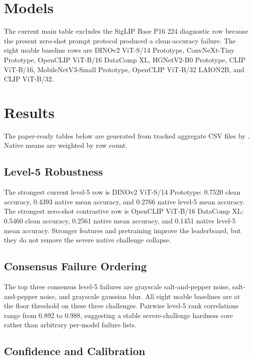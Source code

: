 \documentclass[10pt]{article}
\begin{document}
\section{Models}

The current main table excludes the SigLIP Base P16 224 diagnostic row because the present zero-shot prompt protocol produced a clean-accuracy failure. The eight usable baseline rows are DINOv2 ViT-S/14 Prototype, ConvNeXt-Tiny Prototype, OpenCLIP ViT-B/16 DataComp XL, HGNetV2-B0 Prototype, CLIP ViT-B/16, MobileNetV3-Small Prototype, OpenCLIP ViT-B/32 LAION2B, and CLIP ViT-B/32.

\section{Results}

The paper-ready tables below are generated from tracked aggregate CSV files by
. Native means are weighted by row count.

{\small

}

\subsection{Level-5 Robustness}

The strongest current level-5 row is DINOv2 ViT-S/14 Prototype: 0.7520 clean accuracy, 0.4393 native mean accuracy, and 0.2766 native level-5 mean accuracy. The strongest zero-shot contrastive row is OpenCLIP ViT-B/16 DataComp XL: 0.5460 clean accuracy, 0.2561 native mean accuracy, and 0.1451 native level-5 mean accuracy. Stronger features and pretraining improve the leaderboard, but they do not remove the severe native challenge collapse.

\subsection{Consensus Failure Ordering}

The top three consensus level-5 failures are grayscale salt-and-pepper noise, salt-and-pepper noise, and grayscale gaussian blur. All eight usable baselines are at the floor threshold on these three challenges. Pairwise level-5 rank correlations range from 0.892 to 0.988, suggesting a stable severe-challenge hardness core rather than arbitrary per-model failure lists.

\subsection{Confidence and Calibration}
\end{document}
